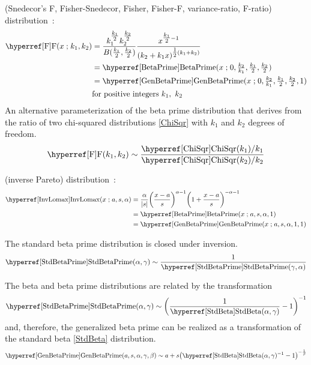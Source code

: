  (Snedecor's F, Fisher-Snedecor, Fisher, Fisher-F, variance-ratio, F-ratio) distribution~\cite{Snedecor1934, Aroian1941, Johnson1995}:
\begin{align}
\label{F}
\opr{F}(x\given k_1,k_2) &= \frac{k_1^{\tfrac{k_1}{2} }   k_2^{\tfrac{k_2}{2}}}{ B(\tfrac{k_1}{2}, \tfrac{k_2}{2})    }
 \frac{x^{\tfrac{k_1}{2} -1}}{(k_2 + k_1 x)^{\tfrac{1}{2}(k_1+k_2)}} \checked
 \\ & =  \opr{BetaPrime}(x\given  0,\tfrac{k_2}{k_1}, \tfrac{k_1}{2},\tfrac{k_2}{2}) \notag \checked
 \\ & =  \opr{GenBetaPrime}(x\given  0,\tfrac{k_2}{k_1}, \tfrac{k_1}{2},\tfrac{k_2}{2},1) \checked
 \notag
\\ & \text{for positive integers } k_1,\ k_2 \notag \checked
\end{align}
An alternative parameterization of the beta prime distribution that derives from the ratio of two chi-squared distributions \eqref{ChiSqr} with $k_1$ and $k_2$ degrees of freedom.
\[
\opr{F}(k_1,k_2) \sim \frac{\opr{ChiSqr}(k_1) / k_1 }{\opr{ChiSqr}(k_2) / k_2} \checked
\notag
\]



 (inverse Pareto) distribution~\cite{Kleiber2003}: 
\begin{align}
\label{InvLomax}
\opr{InvLomax}(x\given a, s,\alpha) &= \frac{\alpha}{|s|} \Left(\frac{x-a}{s}\Right)^{\alpha -1} \Left(1+\frac{x-a}{s}\Right)^{-\alpha-1} \checked
\\ \notag &= \opr{BetaPrime}(x\given a, s, \alpha,1) \checked
\\ \notag &= \opr{GenBetaPrime}(x\given a, s, \alpha,1,1) \checked
\end{align}






The standard beta prime distribution is closed under inversion.
\[
\opr{StdBetaPrime}(\alpha,\gamma) \sim \frac{1}{\opr{StdBetaPrime}(\gamma,\alpha)} \checked
\notag
\]


The beta and beta prime distributions are related by the transformation~
\[
\opr{StdBetaPrime}(\alpha,\gamma) \sim \Left( \frac{1}{\opr{StdBeta}(\alpha,\gamma)}  -1 \Right)^{-1} \checked
\notag
\]
and, therefore, the generalized beta prime can be realized as a transformation of the standard beta \eqref{StdBeta} distribution.
\[
\opr{GenBetaPrime}(a,s,\alpha,\gamma,\beta) \sim a+ s\Left( \opr{StdBeta}(\alpha,\gamma)^{-1} -1\Right)^{-\sfrac{1}{\beta}}
\checked
\notag
\]



